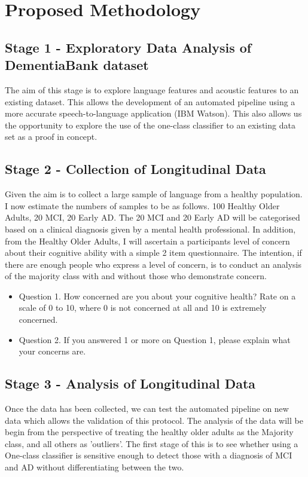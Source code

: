 \documentclass[11pt]{article}
\begin{document}
\section{Proposed Methodology}
\subsection{Stage 1 - Exploratory Data Analysis of DementiaBank dataset}
The aim of this stage is to explore language features and acoustic features to an existing dataset. This allows the development of an automated pipeline using a more accurate speech-to-language application (IBM Watson). This also allows us the opportunity to explore the use of the one-class classifier to an existing data set as a proof in concept. 

\subsection{Stage 2 - Collection of Longitudinal Data}
Given the aim is to collect a large sample of language from a healthy population. I now estimate the numbers of samples to be as follows. 100 Healthy Older Adults, 20 MCI, 20 Early AD. The 20 MCI and 20 Early AD will be categorised based on a clinical diagnosis given by a mental health professional. In addition, from the Healthy Older Adults, I will ascertain a participants level of concern about their cognitive ability with a simple 2 item questionnaire. The intention, if there are enough people who express a level of concern, is to conduct an analysis of the majority class with and without those who demonstrate concern.
\par 
\begin{itemize}
	\item Question 1. How concerned are you about your cognitive health? Rate on a scale of 0 to 10, where 0 is not concerned at all and 10 is extremely concerned.
	\item Question 2. If you answered 1 or more on Question 1, please explain what your concerns are.
\end{itemize}
\par 

\subsection{Stage 3 - Analysis of Longitudinal Data}
Once the data has been collected, we can test the automated pipeline on new data which allows the validation of this protocol.  The analysis of the data will be begin from the perspective of treating the healthy older adults as the Majority class, and all others as 'outliers'. The first stage of this is to see whether using a One-class classifier is sensitive enough to detect those with a diagnosis of MCI and AD without differentiating between the two. 
\end{document}
